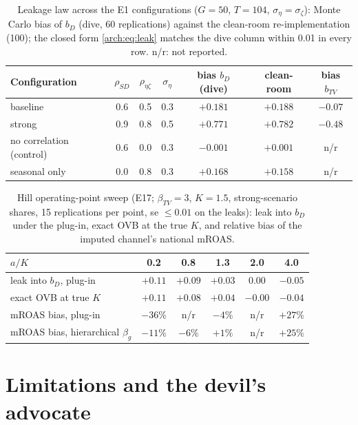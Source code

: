 \begin{table}[htbp]
\centering\small
\caption{Leakage law across the E1 configurations ($G = 50$, $T = 104$, $\sigma_\eta = \sigma_\zeta$): Monte Carlo bias of $b_D$ (dive, 60 replications) against the clean-room re-implementation (100); the closed form \cref{arch:eq:leak} matches the dive column within 0.01 in every row. n/r: not reported.}
\label{arch:tab:leak}
\begin{tabular}{lcccccc}
\toprule
Configuration & $\rho_{SD}$ & $\rho_{\eta\zeta}$ & $\sigma_\eta$ & bias $b_D$ (dive) & clean-room & bias $b_{TV}$ \\
\midrule
baseline & 0.6 & 0.5 & 0.3 & $+0.181$ & $+0.188$ & $-0.07$ \\
strong & 0.9 & 0.8 & 0.5 & $+0.771$ & $+0.782$ & $-0.48$ \\
no correlation (control) & 0.6 & 0.0 & 0.3 & $-0.001$ & $+0.001$ & n/r \\
seasonal only & 0.0 & 0.8 & 0.3 & $+0.168$ & $+0.158$ & n/r \\
\bottomrule
\end{tabular}
\end{table}

\begin{table}[htbp]
\centering\small
\caption{Hill operating-point sweep (E17; $\beta_{TV} = 3$, $K = 1.5$, strong-scenario shares, 15 replications per point, se $\le 0.01$ on the leaks): leak into $b_D$ under the plug-in, exact OVB at the true $K$, and relative bias of the imputed channel's national mROAS.}
\label{arch:tab:hill}
\begin{tabular}{lccccc}
\toprule
$a/K$ & 0.2 & 0.8 & 1.3 & 2.0 & 4.0 \\
\midrule
leak into $b_D$, plug-in & $+0.11$ & $+0.09$ & $+0.03$ & $0.00$ & $-0.05$ \\
exact OVB at true $K$ & $+0.11$ & $+0.08$ & $+0.04$ & $-0.00$ & $-0.04$ \\
mROAS bias, plug-in & $-36\%$ & n/r & $-4\%$ & n/r & $+27\%$ \\
mROAS bias, hierarchical $\beta_g$ & $-11\%$ & $-6\%$ & $+1\%$ & n/r & $+25\%$ \\
\bottomrule
\end{tabular}
\end{table}

\section{Limitations and the devil's advocate}

